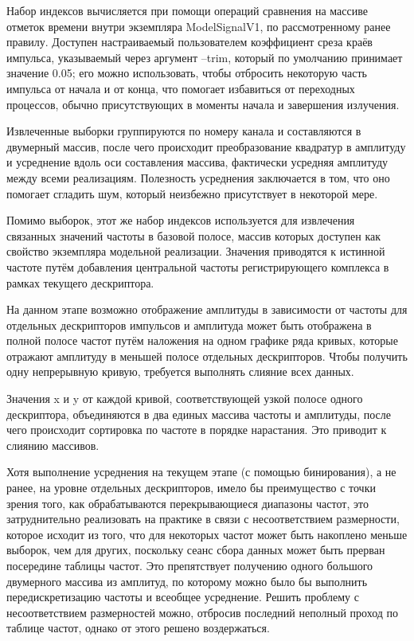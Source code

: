 \documentclass{report}
\begin{document}
Набор индексов вычисляется при помощи операций сравнения на массиве отметок времени внутри экземпляра ModelSignalV1, по рассмотренному ранее правилу. Доступен настраиваемый пользователем коэффициент среза краёв импульса, указываемый через аргумент --trim, который по умолчанию принимает значение 0.05; его можно использовать, чтобы отбросить некоторую часть импульса от начала и от конца, что помогает избавиться от переходных процессов, обычно присутствующих в моменты начала и завершения излучения.

Извлеченные выборки группируются по номеру канала и составляются в двумерный массив, после чего происходит преобразование квадратур в амплитуду и усреднение вдоль оси составления массива, фактически усредняя амплитуду между всеми реализациям. Полезность усреднения заключается в том, что оно помогает сгладить шум, который неизбежно присутствует в некоторой мере.

Помимо выборок, этот же набор индексов используется для извлечения связанных значений частоты в базовой полосе, массив которых доступен как свойство экземпляра модельной реализации. Значения приводятся к истинной частоте путём добавления центральной частоты регистрирующего комплекса в рамках текущего дескриптора.

На данном этапе возможно отображение амплитуды в зависимости от частоты для отдельных дескрипторов импульсов и амплитуда может быть отображена в полной полосе частот путём наложения на одном графике ряда кривых, которые отражают амплитуду в меньшей полосе отдельных дескрипторов. Чтобы получить одну непрерывную кривую, требуется выполнять слияние всех данных.

Значения x и y от каждой кривой, соответствующей узкой полосе одного дескриптора, объединяются в два единых массива частоты и амплитуды, после чего происходит сортировка по частоте в порядке нарастания. Это приводит к слиянию массивов.

Хотя выполнение усреднения на текущем этапе (с помощью бинирования), а не ранее, на уровне отдельных дескрипторов, имело бы преимущество с точки зрения того, как обрабатываются перекрывающиеся диапазоны частот, это затруднительно реализовать на практике в связи с несоответствием размерности, которое исходит из того, что для некоторых частот может быть накоплено меньше выборок, чем для других, поскольку сеанс сбора данных может быть прерван посередине таблицы частот. Это препятствует получению одного большого двумерного массива из амплитуд, по которому можно было бы выполнить передискретизацию частоты и всеобщее усреднение. Решить проблему с несоответствием размерностей можно, отбросив последний неполный проход по таблице частот, однако от этого решено воздержаться.
\end{document}
